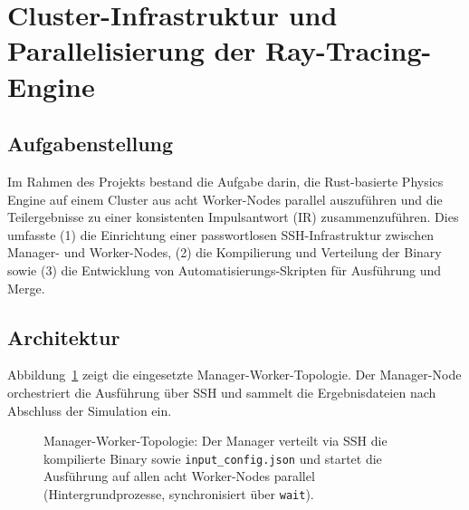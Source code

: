 \documentclass{article}
\begin{document}
\section{Cluster-Infrastruktur und Parallelisierung der Ray-Tracing-Engine}
\label{sec:cluster}

\subsection{Aufgabenstellung}
Im Rahmen des Projekts bestand die Aufgabe darin, die Rust-basierte Physics
Engine auf einem Cluster aus acht Worker-Nodes parallel auszuführen und die Teilergebnisse zu 
einer konsistenten Impulsantwort (IR) zusammenzuführen. Dies umfasste (1) die Einrichtung einer 
passwortlosen SSH-Infrastruktur zwischen Manager- und Worker-Nodes, (2) die Kompilierung und 
Verteilung der Binary sowie (3) die
Entwicklung von Automatisierungs-Skripten für Ausführung und Merge.

\subsection{Architektur}
Abbildung~\ref{fig:cluster-arch} zeigt die eingesetzte Manager-Worker-Topologie.
Der Manager-Node orchestriert die Ausführung über SSH und sammelt die
Ergebnisdateien nach Abschluss der Simulation ein.

\begin{figure}[htbp]
 \centering
 \caption{Manager-Worker-Topologie: Der Manager verteilt via SSH die
 kompilierte Binary sowie \texttt{input\_config.json} und startet die
 Ausführung auf allen acht Worker-Nodes parallel (Hintergrundprozesse,
 synchronisiert über \texttt{wait}).}
 \label{fig:cluster-arch}
\end{figure}
\end{document}
